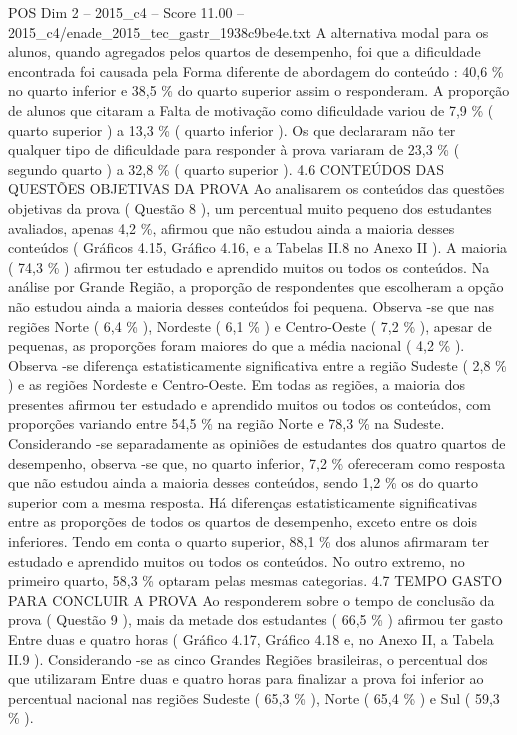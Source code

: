 \begin{textsample}{POS Dim 2 – 2015\_c4 – Score 11.00 – 2015\_c4/enade\_2015\_tec\_gastr\_1938c9be4e.txt}
A alternativa modal para os alunos, quando agregados pelos quartos de desempenho, foi que a dificuldade encontrada foi causada pela Forma diferente de abordagem do conteúdo : 40,6 \% no quarto inferior e 38,5 \% do quarto superior assim o responderam.
A proporção de alunos que citaram a Falta de motivação como dificuldade variou de 7,9 \% ( quarto superior ) a 13,3 \% ( quarto inferior ).
Os que declararam não ter qualquer tipo de dificuldade para responder à prova variaram de 23,3 \% ( segundo quarto ) a 32,8 \% ( quarto superior ). 4.6 CONTEÚDOS DAS QUESTÕES OBJETIVAS DA PROVA Ao analisarem os conteúdos das questões objetivas da prova ( Questão 8 ), um percentual muito pequeno dos estudantes avaliados, apenas 4,2 \%, afirmou que não estudou ainda a maioria desses conteúdos ( Gráficos 4.15, Gráfico 4.16, e a Tabelas II.8 no Anexo II ).
A maioria ( 74,3 \% ) afirmou ter estudado e aprendido muitos ou todos os conteúdos.
Na análise por Grande Região, a proporção de respondentes que escolheram a opção não estudou ainda a maioria desses conteúdos foi pequena.
Observa -se que nas regiões Norte ( 6,4 \% ), Nordeste ( 6,1 \% ) e Centro-Oeste ( 7,2 \% ), apesar de pequenas, as proporções foram maiores do que a média nacional ( 4,2 \% ).
Observa -se diferença estatisticamente significativa entre a região Sudeste ( 2,8 \% ) e as regiões Nordeste e Centro-Oeste.
Em todas as regiões, a maioria dos presentes afirmou ter estudado e aprendido muitos ou todos os conteúdos, com proporções variando entre 54,5 \% na região Norte e 78,3 \% na Sudeste.
Considerando -se separadamente as opiniões de estudantes dos quatro quartos de desempenho, observa -se que, no quarto inferior, 7,2 \% ofereceram como resposta que não estudou ainda a maioria desses conteúdos, sendo 1,2 \% os do quarto superior com a mesma resposta.
Há diferenças estatisticamente significativas entre as proporções de todos os quartos de desempenho, exceto entre os dois inferiores.
Tendo em conta o quarto superior, 88,1 \% dos alunos afirmaram ter estudado e aprendido muitos ou todos os conteúdos.
No outro extremo, no primeiro quarto, 58,3 \% optaram pelas mesmas categorias. 4.7 TEMPO GASTO PARA CONCLUIR A PROVA Ao responderem sobre o tempo de conclusão da prova ( Questão 9 ), mais da metade dos estudantes ( 66,5 \% ) afirmou ter gasto Entre duas e quatro horas ( Gráfico 4.17, Gráfico 4.18 e, no Anexo II, a Tabela II.9 ).
Considerando -se as cinco Grandes Regiões brasileiras, o percentual dos que utilizaram Entre duas e quatro horas para finalizar a prova foi inferior ao percentual nacional nas regiões Sudeste ( 65,3 \% ), Norte ( 65,4 \% ) e Sul ( 59,3 \% ).

\end{textsample}

